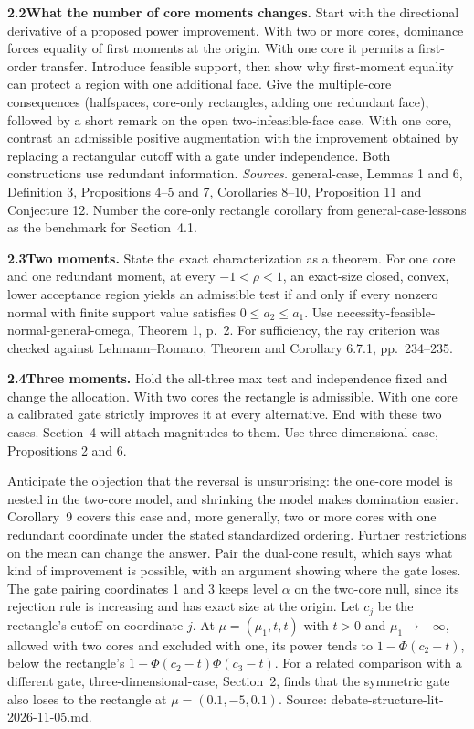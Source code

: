 \documentclass[11pt,letterpaper]{article}
\newcommand{\sub}[1]{\par\smallskip\textbf{#1}\enspace}
\newcommand{\file}[1]{\textsf{#1}}
\begin{document}
\sub{2.2\quad What the number of core moments changes.} Start with the directional derivative of a proposed power improvement. With two or more cores, dominance forces equality of first moments at the origin. With one core it permits a first-order transfer. Introduce feasible support, then show why first-moment equality can protect a region with one additional face. Give the multiple-core consequences (halfspaces, core-only rectangles, adding one redundant face), followed by a short remark on the open two-infeasible-face case. With one core, contrast an admissible positive augmentation with the improvement obtained by replacing a rectangular cutoff with a gate under independence. Both constructions use redundant information. \textit{Sources.} \file{general-case}, Lemmas 1 and 6, Definition 3, Propositions 4--5 and 7, Corollaries 8--10, Proposition 11 and Conjecture 12. Number the core-only rectangle corollary from \file{general-case-lessons} as the benchmark for Section~4.1.

\sub{2.3\quad Two moments.} State the exact characterization as a theorem. For one core and one redundant moment, at every $-1<\rho<1$, an exact-size closed, convex, lower acceptance region yields an admissible test if and only if every nonzero normal with finite support value satisfies $0\leq a_2\leq a_1$. Use \file{necessity-feasible-normal-general-omega}, Theorem 1, p.~2. For sufficiency, the ray criterion was checked against Lehmann--Romano, Theorem and Corollary 6.7.1, pp.~234--235.

\newpage
\sub{2.4\quad Three moments.} Hold the all-three max test and independence fixed and change the allocation. With two cores the rectangle is admissible. With one core a calibrated gate strictly improves it at every alternative. End with these two cases. Section~4 will attach magnitudes to them. Use \file{three-dimensional-case}, Propositions 2 and 6.

Anticipate the objection that the reversal is unsurprising: the one-core model is nested in the two-core model, and shrinking the model makes domination easier. Corollary~9 covers this case and, more generally, two or more cores with one redundant coordinate under the stated standardized ordering. Further restrictions on the mean can change the answer. Pair the dual-cone result, which says what kind of improvement is possible, with an argument showing where the gate loses. The gate pairing coordinates 1 and 3 keeps level $\alpha$ on the two-core null, since its rejection rule is increasing and has exact size at the origin. Let $c_j$ be the rectangle's cutoff on coordinate $j$. At $\mu=(\mu_1,t,t)$ with $t>0$ and $\mu_1\to-\infty$, allowed with two cores and excluded with one, its power tends to $1-\Phi(c_2-t)$, below the rectangle's $1-\Phi(c_2-t)\Phi(c_3-t)$. For a related comparison with a different gate, \file{three-dimensional-case}, Section~2, finds that the symmetric gate also loses to the rectangle at $\mu=(0.1,-5,0.1)$. Source: \file{debate-structure-lit-2026-11-05.md}.
\end{document}
